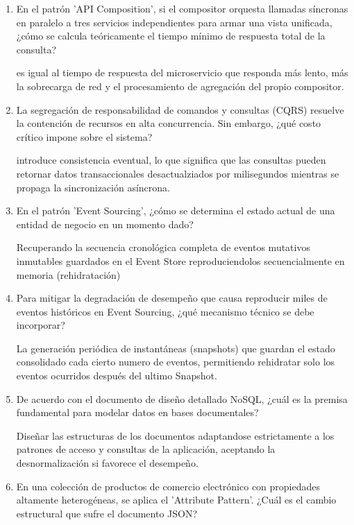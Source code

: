 \begin{enumerate}
cuando se cuenta con un entorno poliglota complejo y servicios legados de caja negra cuyo código fuente no puede modificarse para embeber lógica de infraestructura de red.

\item En el patrón 'API Composition', si el compositor orquesta llamadas síncronas en paralelo a tres servicios independientes para armar una vista unificada, ¿cómo se calcula teóricamente el tiempo mínimo de respuesta total de la consulta?

es igual al tiempo de respuesta del microservicio que responda más lento, más la sobrecarga de red y el procesamiento de agregación del propio compositor.

\item La segregación de responsabilidad de comandos y consultas (CQRS) resuelve la contención de recursos en alta concurrencia. Sin embargo, ¿qué costo crítico impone sobre el sistema?

introduce consistencia eventual, lo que significa que las consultas pueden retornar datos transaccionales desactualziados por milisegundos mientras se propaga la sincronización asíncrona.

\item En el patrón 'Event Sourcing', ¿cómo se determina el estado actual de una entidad de negocio en un momento dado?

Recuperando la secuencia cronológica completa de eventos mutativos inmutables guardados en el Event Store reproduciendolos secuencialmente en memoria (rehidratación)

\item Para mitigar la degradación de desempeño que causa reproducir miles de eventos históricos en Event Sourcing, ¿qué mecanismo técnico se debe incorporar?

La generación periódica de instantáneas (snapshots) que guardan el estado consolidado cada cierto numero de eventos, permitiendo rehidratar solo los eventos ocurridos después del ultimo Snapshot.

\item De acuerdo con el documento de diseño detallado NoSQL, ¿cuál es la premisa fundamental para modelar datos en bases documentales?


Diseñar las estructuras de los documentos adaptandose estrictamente a los patrones de acceso y consultas de la aplicación, aceptando la desnormalización si favorece el desempeño.

\item En una colección de productos de comercio electrónico con propiedades altamente heterogéneas, se aplica el 'Attribute Pattern'. ¿Cuál es el cambio estructural que sufre el documento JSON?


\end{enumerate}

